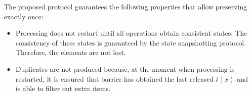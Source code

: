 The proposed protocol guarantees the following properties that allow preserving exactly once:

\begin{itemize}
    \item Processing does not restart until all operations obtain consistent states. The consistency of these states is guaranteed by the state snapshotting protocol. Therefore, the elements are not lost.
    \item Duplicates are not produced because, at the moment when processing is restarted, it is ensured that barrier has obtained the last released $t(x)$ and is able to filter out extra items.
\end{itemize}